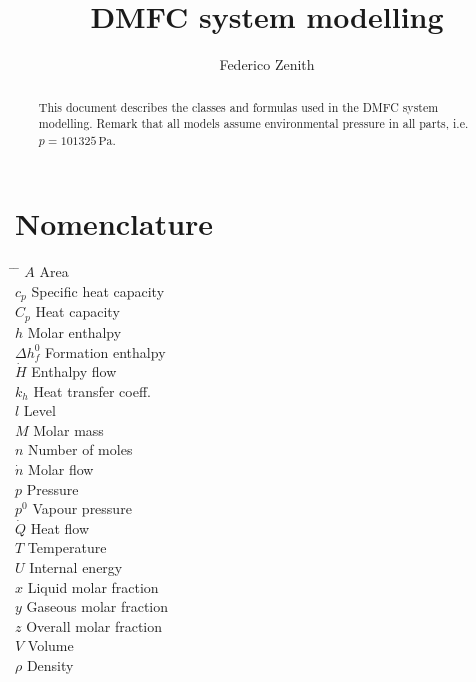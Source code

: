 \documentclass[a4paper]{article}
\title{DMFC system modelling}
\author{Federico Zenith}
\begin{document}
\maketitle

\begin{abstract}
This document describes the classes and formulas used in the DMFC system
modelling.
Remark that all models assume environmental pressure in all parts, i.e.
$p = 101325\, \mathrm{Pa}$.
\end{abstract}

\section*{Nomenclature}
\setlength{\columnsep}{1pc}
\setlength\columnseprule{.4pt}
\begin{multicols}{2}
\begin{tabbing}
\hspace{0.75cm} \= \hspace*{3.5cm} \= \kill
$A$ \> Area \> [m\textsuperscript{2}]\\
$c_p$ \> Specific heat capacity \> [J/mol\,K]\\
$C_p$ \> Heat capacity \> [J/K]\\
$h$ \> Molar enthalpy \> [J/mol]\\
$\Delta h_f^0$ \> Formation enthalpy \> [J/mol]\\
$\dot H$ \> Enthalpy flow \> [W]\\
$k_h$ \> Heat transfer coeff. \> [W/K] \\
$l$ \> Level \> [m] \\
$M$ \> Molar mass \> [kg/mol]\\
$n$ \> Number of moles \> [mol]\\
$\dot n$ \> Molar flow \> [mol/s]\\
$p$ \> Pressure \> [Pa]\\
$p^0$ \> Vapour pressure \> [Pa]\\
$\dot Q$ \> Heat flow \> [W]\\
$T$ \> Temperature \> [K]\\
$U$ \> Internal energy \> [J]\\
$x$ \> Liquid molar fraction \> [-] \\
$y$ \> Gaseous molar fraction \> [-] \\
$z$ \> Overall molar fraction \> [-] \\
$V$ \> Volume \> [m\textsuperscript{3}]\\
$\rho$ \> Density \> [kg/m\textsuperscript{3}]\\

\end{tabbing}
\end{multicols}
\end{document}
